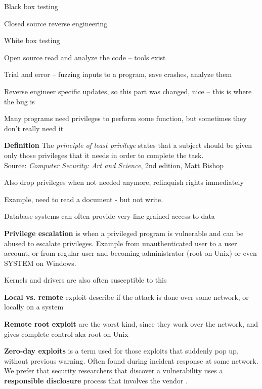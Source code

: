 \documentclass[Screen16to9,17pt]{foils}
\begin{document}

\begin{list1}
\item Black box testing
\item Closed source reverse engineering
\item White box testing
\item Open source read and analyze the code -- tools exist
\item Trial and error -- fuzzing inputs to a program, save crashes, analyze them
\item Reverse engineer specific updates, so this part was changed, nice -- this is where the bug is
\end{list1}



\begin{list1}
\item Many programs need privileges to perform some function, but sometimes they don't really need it
\item {\bf Definition} The \emph{principle of least privilege} states that a subject should be given only those privileges that it needs in order to complete the task.\\
Source:  \emph{Computer Security: Art and Science}, 2nd edition, Matt Bishop

\item Also drop privileges when not needed anymore, relinquish rights immediately
\item Example, need to read a document - but not write.
\item Database systems can often provide very fine grained access to data
\end{list1}

\begin{list1}
\item {\bfseries Privilege escalation} is when a privileged program is vulnerable and can be abused to escalate privileges. Example from unauthenticated user to a user account, or from regular user and becoming administrator (root on Unix) or even SYSTEM on Windows.
\item Kernels and drivers are also often susceptible to this
\end{list1}



\begin{list1}
\item {\bfseries Local vs. remote} exploit describe if the attack is done over some network, or locally on a system
\item {\bfseries Remote root exploit}
are the worst kind, since they work over the network, and gives complete control aka root on Unix
\item {\bfseries Zero-day exploits} is a term used for those exploits that suddenly pop up, without previous warning. Often found during incident response at some network. We prefer that security researchers that discover a vulnerability uses a {\bf responsible disclosure} process that involves the vendor .
\end{list1}
\end{document}
